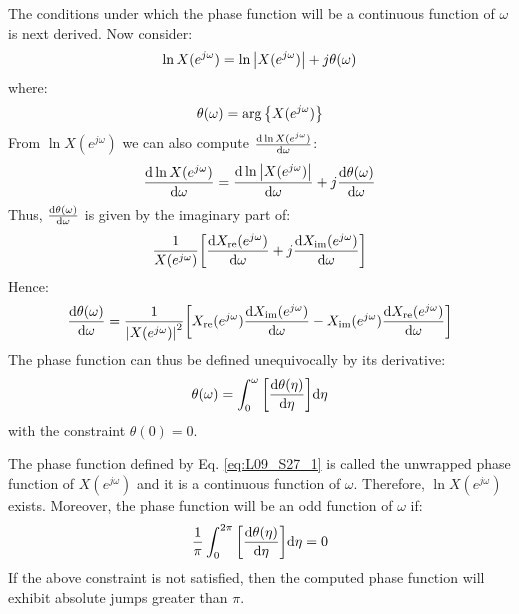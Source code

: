 \documentclass[../../main/main.tex]{subfiles}
\begin{document}
The conditions under which the phase function will be a continuous function of \( \omega \) is next derived. Now consider:
\begin{equation}
    \ln{X(e^{j\omega})}
    =
    \ln{\abs{X(e^{j\omega})}} + j\theta(\omega)
    \label{eq:L09_S23_1}
\end{equation}
where:
\begin{equation}
    \theta(\omega)
    =
    \arg\qty{X(e^{j\omega})}
    \label{eq:L09_S23_2}
\end{equation}
From \( \ln{X(e^{j\omega})} \) we can also compute \( \dv{\ln{X(e^{j\omega})}}{\omega} \):
\begin{equation}
    \dv{\ln{X(e^{j\omega})}}{\omega}
    =
    \dv{\ln{\abs{X(e^{j\omega})}}}{\omega} + j \dv{\theta(\omega)}{\omega}
    \label{eq:L09_S25_1}
\end{equation}
Thus, \( \dv{\theta(\omega)}{\omega} \) is given by the imaginary part of:
\begin{equation}
    \frac{1}{X(e^{j\omega})}
    \qty[
    \dv{X_{\mathrm{re}}(e^{j\omega})}{\omega} + j \dv{X_{\mathrm{im}}(e^{j\omega})}{\omega}
    ]
    \label{eq:L09_S26_1}
\end{equation}
Hence:
\begin{equation}
    \dv{\theta(\omega)}{\omega}
    =
    \frac{1}{\abs{X(e^{j\omega})}^2}
    \qty[
    X_{\mathrm{re}}(e^{j\omega}) \dv{X_{\mathrm{im}}(e^{j\omega})}{\omega}
    - X_{\mathrm{im}}(e^{j\omega}) \dv{X_{\mathrm{re}}(e^{j\omega})}{\omega}
    ]
    \label{eq:L09_S26_2}
\end{equation}
The phase function can thus be defined unequivocally by its derivative:
\begin{equation}
    \theta(\omega)
    =
    \int_{0}^{\omega} \qty[\dv{\theta(\eta)}{\eta}] \mathrm{d}{\eta}
    \label{eq:L09_S27_1}
\end{equation}
with the constraint \( \theta(0) = 0 \).

The phase function defined by Eq. \ref{eq:L09_S27_1} is called the unwrapped phase function of \( X(e^{j\omega}) \) and it is a continuous function of \( \omega \). Therefore, \( \ln{X(e^{j\omega})} \) exists.
Moreover, the phase function will be an odd function of \( \omega \) if:
\begin{equation}
    \frac{1}{\pi} \int_{0}^{2\pi} \qty[\dv{\theta(\eta)}{\eta}] \mathrm{d}{\eta}
    =
    0
    \label{eq:L09_S29_1}
\end{equation}
If the above constraint is not satisfied, then the computed phase function will exhibit absolute jumps greater than \( \pi \).
\end{document}

